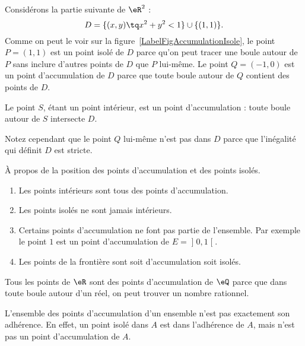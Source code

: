 \begin{example}
	Considérons la partie suivante de \( \eR^2\) :
	\begin{equation}	\label{Eq2807BouleIso}
		D=\{ (x,y)\tq x^2+y^2<1\}\cup\{ (1,1) \}.
	\end{equation}
	Comme on peut le voir sur la figure~\ref{LabelFigAccumulationIsole}, le point \( P=(1,1)\) est un point isolé de \( D\) parce qu'on peut tracer une boule autour de \( P\) sans inclure d'autres points de \( D\) que \( P\) lui-même. Le point \( Q=(-1,0)\) est un point d'accumulation de \( D\) parce que toute boule autour de \( Q\) contient des points de \( D\).

	Le point \( S\), étant un point intérieur, est un point d'accumulation : toute boule autour de \( S\) intersecte \( D\).

	Notez cependant que le point \( Q\) lui-même n'est pas dans \( D\) parce que l'inégalité qui définit \( D\) est stricte.
\end{example}

\begin{remark}
	À propos de la position des points d'accumulation et des points isolés.
	\begin{enumerate}
		\item
		      Les points intérieurs sont tous des points d'accumulation.
		\item
		      Les points isolés ne sont jamais intérieurs.
		\item
		      Certains points d'accumulation ne font pas partie de l'ensemble. Par exemple le point \( 1\) est un point d'accumulation de \( E=\mathopen] 0 , 1 \mathclose[\).
		\item
		      Les points de la frontière sont soit d'accumulation soit isolés.
	\end{enumerate}
\end{remark}

\begin{example}
	Tous les points de \( \eR\) sont des points d'accumulation de \( \eQ\) parce que dans toute boule autour d'un réel, on peut trouver un nombre rationnel.
\end{example}

\begin{remark}
	L'ensemble des points d'accumulation d'un ensemble n'est pas exactement son adhérence. En effet, un point isolé dans \( A\) est dans l'adhérence de \( A\), mais n'est pas un point d'accumulation de \( A\).
\end{remark}

